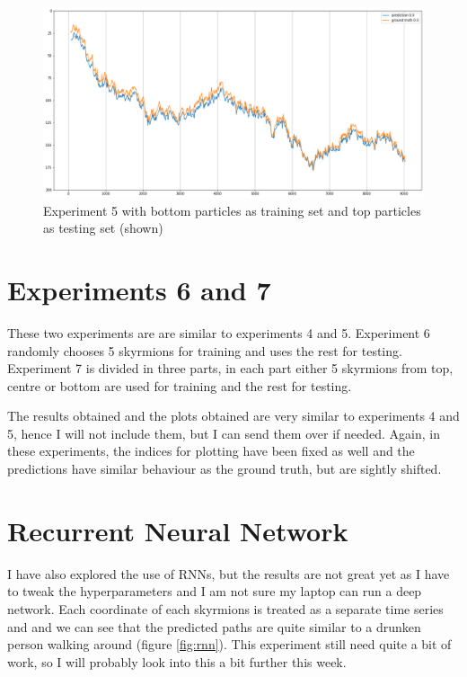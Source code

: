 \documentclass[a4paper]{article}
\begin{document}
\begin{figure}[h]
  \centering
  \includegraphics[width=\textwidth]{exp 5 test top}
  \caption{Experiment 5 with bottom particles as training set and top particles as testing set (shown)}
\end{figure}

\section{Experiments 6 and 7}
These two experiments are are similar to experiments 4 and 5. Experiment 6 randomly chooses 5 skyrmions for training and uses the rest for testing. Experiment 7 is divided in three parts, in each part either 5 skyrmions from top, centre or bottom are used for training and the rest for testing.

The results obtained and the plots obtained are very similar to experiments 4 and 5, hence I will not include them, but I can send them over if needed. Again, in these experiments, the indices for plotting have been fixed as well and the predictions have similar behaviour as the ground truth, but are sightly shifted.

\section{Recurrent Neural Network}
I have also explored the use of RNNs, but the results are not great yet as I have to tweak the hyperparameters and I am not sure my laptop can run a deep network. Each coordinate of each skyrmions is treated as a separate time series and and we can see that the predicted paths are quite similar to a drunken person walking around (figure \ref{fig:rnn}). This experiment still need quite a bit of work, so I will probably look into this a bit further this week.
\end{document}
